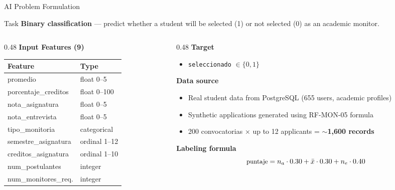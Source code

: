 \documentclass[aspectratio=169,12pt]{beamer}
\begin{document}
\begin{frame}{AI Problem Formulation}
  \begin{block}{Task}
    \textbf{Binary classification} — predict whether a student will be \alert{selected} (1) or
    \alert{not selected} (0) as an academic monitor.
  \end{block}
  \vspace{0.3cm}
  \begin{columns}[T]
    \begin{column}{0.48\textwidth}
      \textbf{Input Features (9)}
      \begin{center}\footnotesize
      \begin{tabular}{ll}
        \toprule
        Feature & Type \\
        \midrule
        promedio & float 0–5 \\
        porcentaje\_creditos & float 0–100 \\
        nota\_asignatura & float 0–5 \\
        nota\_entrevista & float 0–5 \\
        tipo\_monitoria & categorical \\
        semestre\_asignatura & ordinal 1–12 \\
        creditos\_asignatura & ordinal 1–10 \\
        num\_postulantes & integer \\
        num\_monitores\_req. & integer \\
        \bottomrule
      \end{tabular}
      \end{center}
    \end{column}
    \begin{column}{0.48\textwidth}
      \textbf{Target}
      \begin{itemize}
        \item \texttt{seleccionado} $\in \{0, 1\}$
      \end{itemize}
      \vspace{0.4cm}
      \textbf{Data source}
      \begin{itemize}
        \item Real student data from PostgreSQL (655 users, academic profiles)
        \item Synthetic applications generated using RF-MON-05 formula
        \item 200 convocatorias × up to 12 applicants = \textbf{$\sim$1,600 records}
      \end{itemize}
      \vspace{0.2cm}
      \textbf{Labeling formula}
      \[\small\text{puntaje} = n_a \cdot 0.30 + \bar{x} \cdot 0.30 + n_e \cdot 0.40\]
    \end{column}
  \end{columns}
\end{frame}
\end{document}

